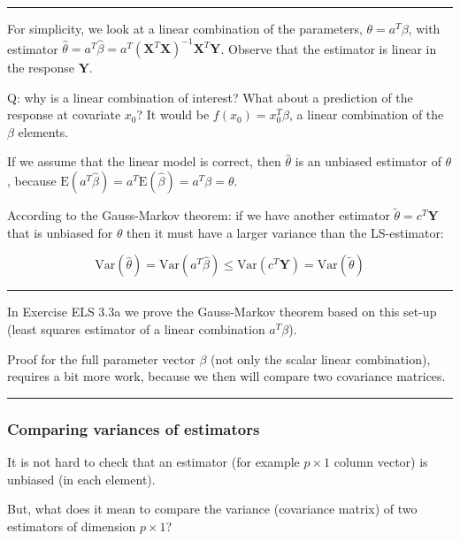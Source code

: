 \documentclass[
  letterpaper,
  DIV=11,
  numbers=noendperiod]{scrartcl}
\begin{document}
\begin{center}\rule{0.5\linewidth}{0.5pt}\end{center}

For simplicity, we look at a linear combination of the parameters,
\(\theta=a^T \beta\), with estimator
\(\hat{\theta}=a^T \hat{\beta}=a^T ({\mathbf X}^T{\mathbf X})^{-1} {\mathbf X}^T {\mathbf Y}\).
Observe that the estimator is linear in the response \({\mathbf Y}\).

Q: why is a linear combination of interest? What about a prediction of
the response at covariate \(x_0\)? It would be \(f(x_0)=x_0^T \beta\), a
linear combination of the \(\beta\) elements.

If we assume that the linear model is correct, then \(\hat{\theta}\) is
an unbiased estimator of \(\theta\), because
\(\text{E}(a^T \hat{\beta})=a^T \text{E}(\hat{\beta})=a^T\beta=\theta\).

According to the Gauss-Markov theorem: if we have another estimator
\(\tilde{\theta}=c^T{\mathbf Y}\) that is unbiased for \(\theta\) then
it must have a larger variance than the LS-estimator:

\[\text{Var}(\hat{\theta})=\text{Var}(a^T \hat{\beta})\le \text{Var}(c^T{\mathbf Y})=\text{Var}(\tilde{\theta})\]

\begin{center}\rule{0.5\linewidth}{0.5pt}\end{center}

In Exercise ELS 3.3a we prove the Gauss-Markov theorem based on this
set-up (least squares estimator of a linear combination \(a^T\beta\)).

Proof for the full parameter vector \(\beta\) (not only the scalar
linear combination), requires a bit more work, because we then will
compare two covariance matrices.

\begin{center}\rule{0.5\linewidth}{0.5pt}\end{center}

\hypertarget{comparing-variances-of-estimators}{%
\subsubsection{Comparing variances of
estimators}\label{comparing-variances-of-estimators}}

It is not hard to check that an estimator (for example \(p\times 1\)
column vector) is unbiased (in each element).

But, what does it mean to compare the variance (covariance matrix) of
two estimators of dimension \(p \times 1\)?
\end{document}
